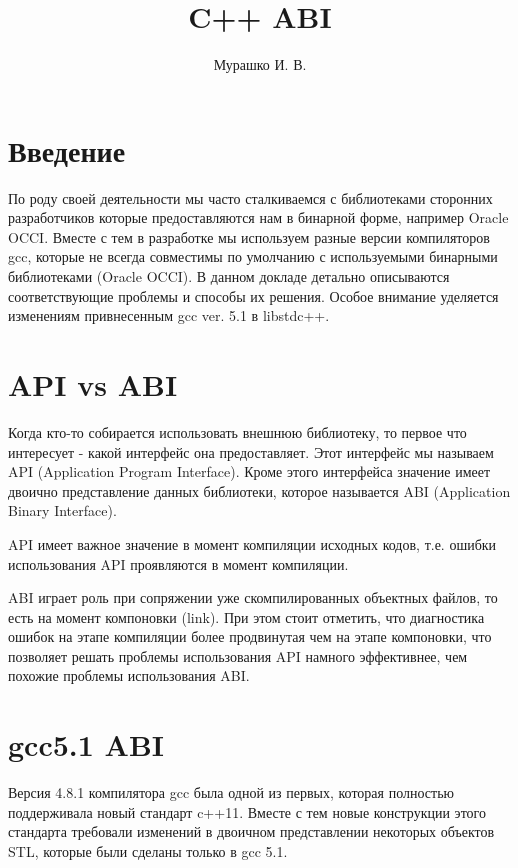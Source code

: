 \documentclass[14pt,a4paper]{article}
\title{C++ ABI}
\author{Мурашко И. В.}
\date{}
\begin{document}
\Russian

\maketitle

\section*{Введение}
По роду своей деятельности мы часто сталкиваемся с библиотеками сторонних 
разработчиков которые предоставляются нам в бинарной форме, например 
Oracle OCCI. Вместе с тем в разработке мы используем разные версии 
компиляторов gcc, которые не всегда совместимы по умолчанию с
используемыми бинарными библиотеками (Oracle OCCI). 
В данном докладе детально описываются соответствующие проблемы и способы 
их решения. Особое внимание уделяется изменениям привнесенным gcc ver.
5.1 в libstdc++.

\section{API vs ABI}

Когда кто-то собирается использовать внешнюю библиотеку, то первое что
интересует - какой интерфейс она предоставляет. Этот интерфейс мы
называем API (Application Program Interface). Кроме этого
интерфейса значение имеет двоично представление данных библиотеки,
которое называется ABI (Application Binary Interface).

API имеет важное значение в момент компиляции исходных кодов, т.е.
ошибки использования API проявляются в момент компиляции.

ABI играет роль при сопряжении уже скомпилированных объектных файлов,
то есть на момент компоновки (link). При этом стоит отметить, что
диагностика ошибок на этапе компиляции более продвинутая чем на этапе
компоновки, что позволяет решать проблемы использования API намного
эффективнее, чем похожие проблемы использования ABI. 


\section{gcc5.1 ABI}

Версия 4.8.1 компилятора gcc была одной из первых, которая полностью
поддерживала новый стандарт c++11. Вместе с тем новые конструкции
этого стандарта требовали изменений в двоичном представлении некоторых
объектов STL, которые были сделаны только в gcc 5.1.
\end{document}
